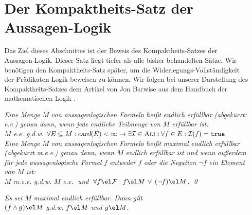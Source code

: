 \section{Der Kompaktheits-Satz der Aussagen-Logik}
Das Ziel dieses Abschnittes ist der Beweis des Kompaktheits-Satzes der Aussagen-Logik.  
Dieser Satz liegt tiefer als alle bisher behandelten S\"{a}tze.  Wir ben\"{o}tigen den Kompaktheits-Satz
sp\"{a}ter, um die Widerlegungs-Vollst\"{a}ndigkeit der Pr\"{a}dikaten-Logik beweisen zu k\"{o}nnen.
Wir folgen bei unserer Darstellung des Kompaktheits-Satzes dem Artikel von Jon Barwise
\cite{barwise:1991a} aus dem Handbuch der mathematischen Logik \cite{barwise:1991}.

\begin{Definition}
  {\em Eine Menge $M$ von aussagenlogischen Formeln heißt \emph{endlich erf\"{u}llbar} (abgek\"{u}rzt: e.e.) genau
    dann, wenn jede endliche Teilmenge von $M$ erf\"{u}llbar ist:
    \\[0.2cm]
    \hspace*{1.3cm} 
    $M$ e.e. \quad g.d.w. \quad 
    $\forall E \subseteq M: \textsl{card}(E) < \infty \rightarrow 
    \exists \mathcal{I} \in \textsc{Ali}: \forall f \in E: \mathcal{I}(f) = \mathtt{true}$
    \\[0.2cm]
    Eine Menge $M$ von aussagenlogischen Formeln heißt \emph{maximal endlich erf\"{u}llbar}
    (abgek\"{u}rzt m.e.e.) genau dann, wenn $M$ endlich erf\"{u}llbar ist und wenn außerdem f\"{u}r
    jede aussagenlogische Formel $f$ entweder $f$ oder die Negation $\neg f$ ein Element von $M$ ist:
    \\[0.2cm]
    \hspace*{1.3cm}
    $M$ m.e.e. \quad g.d.w. \quad 
    $M$ e.e.$\;$ und $\;\forall f \el \mathcal{F}: f \el M \,\vee\, (\neg f) \el M$. \qed
  }
\end{Definition}

\begin{Satz} \label{satz28}
{\em
  Es sei $M$ maximal endlich erf\"{u}llbar.  Dann gilt 
  \\[0.2cm]
  \hspace*{1.3cm}
  $(f \wedge g) \el M$ \quad g.d.w. \quad $f \el M$ und $g \el M$.
}
\end{Satz}

